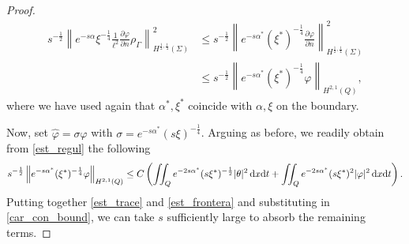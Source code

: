 \documentclass[preprint,10pt]{article}
\numberwithin{equation}{section}
\numberwithin{theorem}{section}
\def\dx{\,\textnormal{d}x}
\def\dt{\textnormal{d}t}
\def\csbd{\rho_{\Gamma}}
\def\dx{\,\textnormal{d}x}
\def\dt{\textnormal{d}t}
\begin{document}
{\begin{proof}
\begin{equation}\label{est_trace}
\begin{split}
s^{-\frac{1}{2}}\left\|e^{-s\alpha}\xi^{-\frac{1}{4}} \frac{1}{\ell^2} \frac{\partial \varphi}{\partial n}\csbd \right\|^2_{H^{\frac{1}{2},\frac{1}{4}}(\Sigma)} & \leq s^{-\frac{1}{2}}\left\|e^{-s\alpha^*}(\xi^*)^{-\frac{1}{4}} \frac{\partial \varphi}{\partial n} \right\|^2_{H^{\frac{1}{2},\frac{1}{4}}(\Sigma)} \\
&\leq s^{-\frac{1}{2}}\left\| e^{-s\alpha^*}(\xi^*)^{-\frac{1}{4}} \varphi \right\|_{H^{2,1}(Q)},
\end{split}
\end{equation}
%
where we have used again that $\alpha^*,\xi^*$ coincide with $\alpha,\xi$ on the boundary. 

Now, set $\widehat \varphi=\sigma \varphi$ with $\sigma=e^{-s\alpha^*}(s\xi)^{-\frac{1}{4}}$. Arguing as before, we readily obtain from \eqref{est_regul} the following 
%
\begin{equation}\label{est_frontera}
s^{-\frac{1}{2}}\left\| e^{-s\alpha^*}(\xi^*)^{-\frac{1}{4}} \varphi \right\|_{H^{2,1}(Q)}\leq C\left(\iint_{Q}e^{-2s\alpha^*}(s\xi^*)^{-\frac{1}{2}}|\theta|^2\dx\dt+\iint_{Q}e^{-2s\alpha^*}(s\xi^*)^2|\varphi|^2\dx\dt\right).
\end{equation}
%
Putting together \eqref{est_trace} and \eqref{est_frontera} and substituting in \eqref{car_con_bound}, we can take $s$ sufficiently large to absorb the remaining terms. 


\end{proof}}
\end{document}
